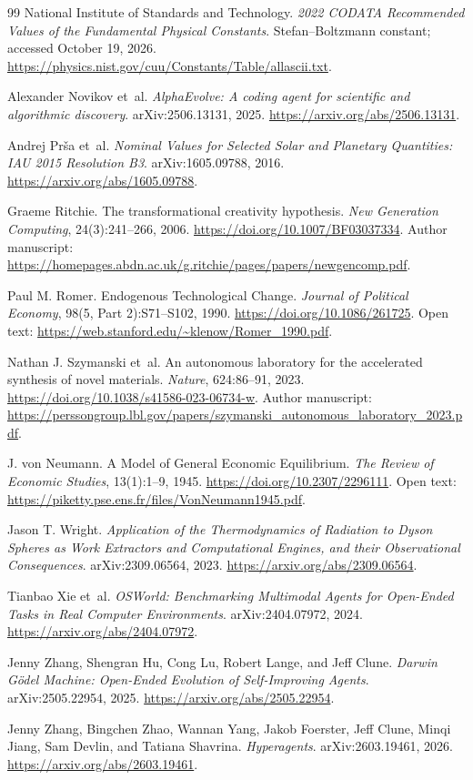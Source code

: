 \documentclass[11pt,letterpaper]{article}
\newcommand{\1}{\mathbf 1}
\theoremstyle{remark}\newtheorem{remark}{Remark}[section]
\begin{document}
\begin{thebibliography}{99}
National Institute of Standards and Technology. \emph{2022 CODATA Recommended Values of the Fundamental Physical Constants}. Stefan--Boltzmann constant; accessed October 19, 2026. \url{https://physics.nist.gov/cuu/Constants/Table/allascii.txt}.

Alexander Novikov et~al. \emph{AlphaEvolve: A coding agent for scientific and algorithmic discovery}. arXiv:2506.13131, 2025. \url{https://arxiv.org/abs/2506.13131}.

Andrej Pr\v{s}a et~al. \emph{Nominal Values for Selected Solar and Planetary Quantities: IAU 2015 Resolution B3}. arXiv:1605.09788, 2016. \url{https://arxiv.org/abs/1605.09788}.

Graeme Ritchie. The transformational creativity hypothesis. \emph{New Generation Computing}, 24(3):241--266, 2006. \url{https://doi.org/10.1007/BF03037334}. Author manuscript: \url{https://homepages.abdn.ac.uk/g.ritchie/pages/papers/newgencomp.pdf}.

Paul M. Romer. Endogenous Technological Change. \emph{Journal of Political Economy}, 98(5, Part 2):S71--S102, 1990. \url{https://doi.org/10.1086/261725}. Open text: \url{https://web.stanford.edu/~klenow/Romer_1990.pdf}.

Nathan J. Szymanski et~al. An autonomous laboratory for the accelerated synthesis of novel materials. \emph{Nature}, 624:86--91, 2023. \url{https://doi.org/10.1038/s41586-023-06734-w}. Author manuscript: \url{https://perssongroup.lbl.gov/papers/szymanski_autonomous_laboratory_2023.pdf}.

J. von Neumann. A Model of General Economic Equilibrium. \emph{The Review of Economic Studies}, 13(1):1--9, 1945. \url{https://doi.org/10.2307/2296111}. Open text: \url{https://piketty.pse.ens.fr/files/VonNeumann1945.pdf}.

Jason T. Wright. \emph{Application of the Thermodynamics of Radiation to Dyson Spheres as Work Extractors and Computational Engines, and their Observational Consequences}. arXiv:2309.06564, 2023. \url{https://arxiv.org/abs/2309.06564}.

Tianbao Xie et~al. \emph{OSWorld: Benchmarking Multimodal Agents for Open-Ended Tasks in Real Computer Environments}. arXiv:2404.07972, 2024. \url{https://arxiv.org/abs/2404.07972}.

Jenny Zhang, Shengran Hu, Cong Lu, Robert Lange, and Jeff Clune. \emph{Darwin G\"odel Machine: Open-Ended Evolution of Self-Improving Agents}. arXiv:2505.22954, 2025. \url{https://arxiv.org/abs/2505.22954}.

Jenny Zhang, Bingchen Zhao, Wannan Yang, Jakob Foerster, Jeff Clune, Minqi Jiang, Sam Devlin, and Tatiana Shavrina. \emph{Hyperagents}. arXiv:2603.19461, 2026. \url{https://arxiv.org/abs/2603.19461}.

\end{thebibliography}
\end{document}
